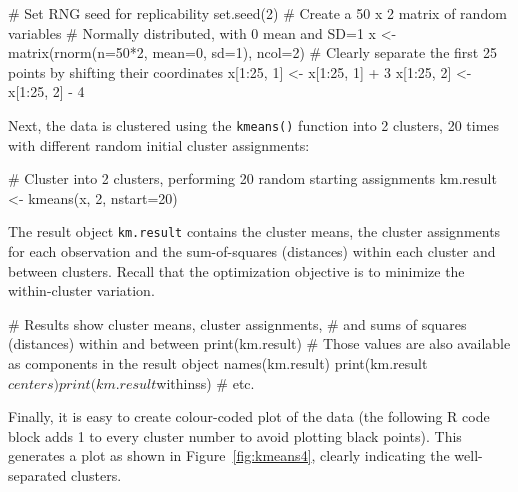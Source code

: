\begin{samepage}
\begin{Rcode}
# Set RNG seed for replicability
set.seed(2)
# Create a 50 x 2 matrix of random variables 
# Normally distributed, with 0 mean and SD=1
x <- matrix(rnorm(n=50*2, mean=0, sd=1), ncol=2)
# Clearly separate the first 25 points by shifting their coordinates
x[1:25, 1] <- x[1:25, 1] + 3
x[1:25, 2] <- x[1:25, 2] - 4
\end{Rcode}
\end{samepage}

\noindent Next, the data is clustered using the \texttt{kmeans()} function into 2 clusters, 20 times with different random initial cluster assignments:

\begin{samepage}
\begin{Rcode}
# Cluster into 2 clusters, performing 20 random starting assignments
km.result <- kmeans(x, 2, nstart=20)
\end{Rcode}
\end{samepage}

The result object \texttt{km.result} contains the cluster means, the cluster assignments for each observation and the sum-of-squares (distances) within each cluster and between clusters. Recall that the optimization objective is to minimize the within-cluster variation.

\begin{samepage}
\begin{Rcode}
# Results show cluster means, cluster assignments, 
# and sums of squares (distances) within and between 
print(km.result)
# Those values are also available as components in the result object
names(km.result)
print(km.result$centers)
print(km.result$withinss)
# etc.
\end{Rcode}
\end{samepage}

Finally, it is easy to create colour-coded plot of the data (the following R code block adds 1 to every cluster number to avoid plotting black points). This generates a plot as shown in Figure~\ref{fig:kmeans4}, clearly indicating the well-separated clusters.

\begin{samepage}
\end{samepage}

